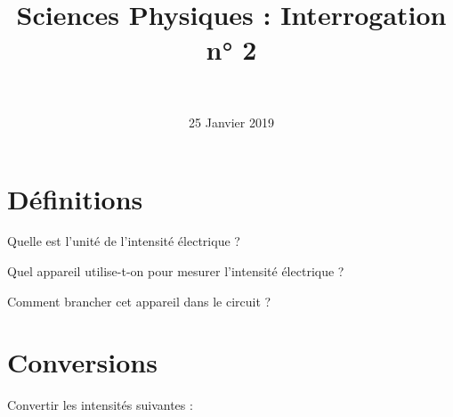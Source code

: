 \documentclass[a4paper,11pt]{exam}
\author{\ }
\date{25 Janvier 2019}
\title{Sciences Physiques : Interrogation n° 2}
\begin{document}
%	

	\maketitle
%	
	
	

%

%

\section{Définitions}

\begin{questions}
	\question Quelle est l'unité de l'intensité électrique ?
	
	\fillwithdottedlines{1.5cm}
	
	\question Quel appareil utilise-t-on pour mesurer l'intensité électrique ?
	\fillwithdottedlines{1.5cm}
	
	\question Comment brancher cet appareil dans le circuit ?
	\fillwithdottedlines{1.5cm}
\end{questions}

\section{Conversions}

Convertir les intensités suivantes :
\end{document}
